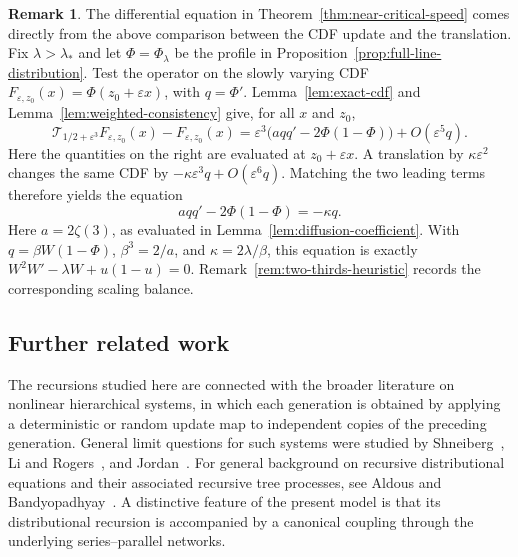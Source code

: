 \documentclass[12pt]{amsart}
\numberwithin{equation}{section}
\theoremstyle{plain}
\theoremstyle{definition}
\newtheorem{remark}[theorem]{Remark}
\begin{document}
\begin{remark}
    The differential equation in Theorem~\ref{thm:near-critical-speed} comes
directly from the above comparison between the CDF update and the translation.
Fix $\lambda>\lambda_*$ and let $\Phi=\Phi_\lambda$ be the profile in
Proposition~\ref{prop:full-line-distribution}. Test the operator on the slowly
varying CDF $F_{\varepsilon,z_0}(x)=\Phi(z_0+\varepsilon x)$, with
$q=\Phi'$.  Lemma~\ref{lem:exact-cdf} and
Lemma~\ref{lem:weighted-consistency} give, for all $x$ and $z_0$,
\[
 \mathcal T_{1/2+\varepsilon^3}F_{\varepsilon,z_0}(x)
 -F_{\varepsilon,z_0}(x)
 =\varepsilon^3\bigl(a q q'-2\Phi(1-\Phi)\bigr)
  +O(\varepsilon^5q).
\]
Here the quantities on the right are evaluated at
$z_0+\varepsilon x$.
A translation by $\kappa\varepsilon^2$ changes the same CDF by
$-\kappa\varepsilon^3q+O(\varepsilon^6q)$.  Matching the two leading terms
therefore yields the  equation
\[
 a q q'-2\Phi(1-\Phi)=-\kappa q.
\]
Here $a=2\zeta(3)$, as evaluated in Lemma~\ref{lem:diffusion-coefficient}. With $q=\beta W(1-\Phi)$, $\beta^3=2/a$, and
$\kappa=2\lambda/\beta$, this equation is exactly
$W^2W'-\lambda W+u(1-u)=0$.   Remark~\ref{rem:two-thirds-heuristic} records the corresponding
scaling balance.

\end{remark}



\subsection{Further related work}

The recursions studied here are connected with the broader literature on
nonlinear hierarchical systems, in which each generation is obtained by
applying a deterministic or random update map to independent copies of the
preceding generation.  General limit questions for such systems were studied
by Shneiberg~\cite{Shneiberg1986}, Li and Rogers~\cite{LiRogers1999}, and
Jordan~\cite{Jordan2002}.  For general background on recursive distributional
equations and their associated recursive tree processes, see Aldous and
Bandyopadhyay~\cite{AldousBandyopadhyay2005}.  A distinctive feature of the
present model is that its distributional recursion is accompanied by a
canonical coupling through the underlying series--parallel networks.
\end{document}
